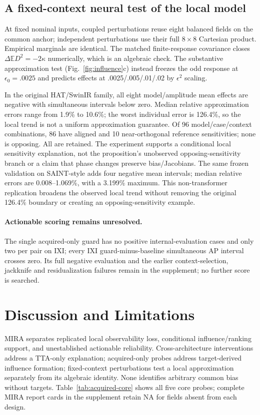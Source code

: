 \documentclass[10pt,twocolumn,letterpaper]{article}
\begin{document}
\subsection{A fixed-context neural test of the local model}
At fixed nominal inputs, coupled perturbations reuse eight balanced fields on the common anchor; independent perturbations use their full $8\times8$ Cartesian product. Empirical marginals are identical. The matched finite-response covariance closes $\Delta\mathbb E D^2=-2\kappa$ numerically, which is an algebraic check. The substantive approximation test (Fig.~\ref{fig:influence}c) instead freezes the odd response at $\epsilon_0=.0025$ and predicts effects at .0025/.005/.01/.02 by $\epsilon^2$ scaling.

In the original HAT/SwinIR family, all eight model/amplitude mean effects are negative with simultaneous intervals below zero. Median relative approximation errors range from 1.9\% to 10.6\%; the worst individual error is 126.4\%, so the local trend is not a uniform approximation guarantee. Of 96 model/case/context combinations, 86 have aligned and 10 near-orthogonal reference sensitivities; none is opposing. All are retained. The experiment supports a conditional local sensitivity explanation, not the proposition's unobserved opposing-sensitivity branch or a claim that phase changes preserve bias/Jacobians. The same frozen validation on SAINT-style adds four negative mean intervals; median relative errors are 0.008--1.069\%, with a 3.199\% maximum. This non-transformer replication broadens the observed local trend without removing the original 126.4\% boundary or creating an opposing-sensitivity example.

\paragraph{Actionable scoring remains unresolved.}
The single acquired-only guard has no positive internal-evaluation cases and only two per pair on IXI; every IXI guard-minus-baseline simultaneous AP interval crosses zero. Its full negative evaluation and the earlier context-selection, jackknife and residualization failures remain in the supplement; no further score is searched.



\section{Discussion and Limitations}
MIRA separates replicated local observability loss, conditional influence/ranking support, and unestablished actionable reliability. Cross-architecture interventions address a TTA-only explanation; acquired-only probes address target-derived influence formation; fixed-context perturbations test a local approximation separately from its algebraic identity. None identifies arbitrary common bias without targets. Table~\ref{tab:acquired-core} shows all five core probes; complete MIRA report cards in the supplement retain NA for fields absent from each design.
\end{document}
